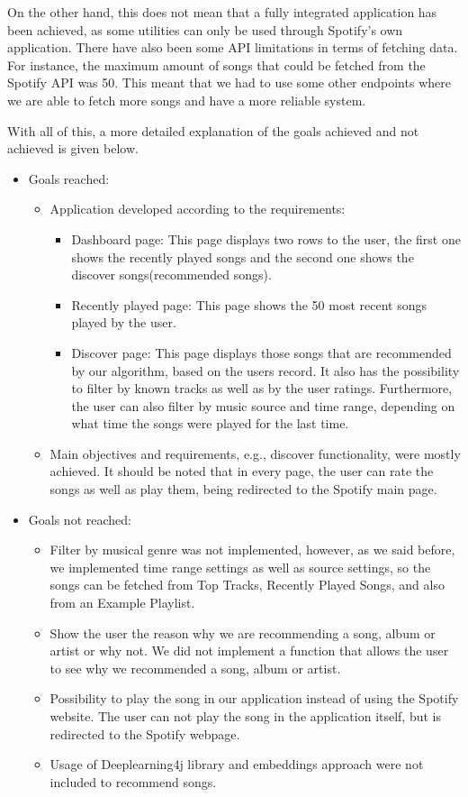 On the other hand, this does not mean that a fully integrated application has been achieved, as some utilities can only be used through Spotify's own application. There have also been some API limitations in terms of fetching data. For instance, the maximum amount of songs that could be fetched from the Spotify API was 50. This meant that we had to use some other endpoints where we are able to fetch more songs and have a more reliable system.

With all of this, a more detailed explanation of the goals achieved and not achieved is given below.

\begin{itemize}
    \item Goals reached:
    \begin{itemize}
        \item Application developed according to the requirements:
        \begin{itemize}
            \item Dashboard page: This page displays two rows to the user, the first one shows the recently played songs and the second one shows the discover songs(recommended songs).
            \item Recently played page: This page shows the 50 most recent songs played by the user.
            \item Discover page: This page displays those songs that are recommended by our algorithm, based on the users record. It also has the possibility to filter by known tracks as well as by the user ratings. Furthermore, the user can also filter by music source and time range, depending on what time the songs were played for the last time.
        \end{itemize}
        \item Main objectives and requirements, e.g., discover functionality, were mostly achieved. It should be noted that in every page, the user can rate the songs as well as play them, being redirected to the Spotify main page.
    \end{itemize}
    \item Goals not reached:
    \begin{itemize}
        \item Filter by musical genre was not implemented, however, as we said before, we implemented time range settings as well as source settings, so the songs can be fetched from Top Tracks, Recently Played Songs, and also from an Example Playlist.
        \item Show the user the reason why we are recommending a song, album or artist or why not. We did not implement a function that allows the user to see why we recommended a song, album or artist.
        \item Possibility to play the song in our application instead of using the Spotify website. The user can not play the song in the application itself, but is redirected to the Spotify webpage.
        \item Usage of Deeplearning4j library and embeddings approach were not included to recommend songs.
    \end{itemize}
\end{itemize}

